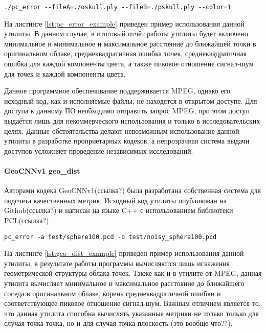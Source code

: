 \begin{lstlisting}[caption={
    Пример использования утилиты mpeg-pcc-dmetric, параметр fileA -
    оригинальное облако, fileB - реконструированное облако, color=1 - также
    вычисляются значения искажения цветов.
}, label={lst:pc_error_example}]
./pc_error --fileA=./oskull.ply --fileB=./pskull.ply --color=1
\end{lstlisting}

На листинге \ref{lst:pc_error_example} приведен пример использования данной
утилиты. В данном случае, в итоговый отчёт работы утилиты будет включено
минимальное и минимальное и максимальное расстояние до ближайшей точки в
оригинальном облаке, среднеквадратичная ошибка точек, среднеквадратичная ошибка
для каждой компоненты цвета, а также пиковое отношение сигнал-шум для точек и
каждой компоненты цвета.

Данное программное обеспечивание поддерживается MPEG, однако его исходный код,
как и исполняемые файлы, не находятся в открытом доступе. Для доступа к данному
ПО необходимо отправить запрос MPEG, при этом доступ выдаётся лишь для
некоммерческого использования и только в исследовательских целях. Данные
обстоятельства делают невозможным использование данной утилиты в разработке
проприетарных кодеков, а непрозрачная система выдачи доступов усложняет
проведение независимых исследований.

\paragraph{GeoCNNv1 geo\_dist}

Авторами кодека GeoCNNv1(ссылка?) была разработана собственная система для
подсчета качественных метрик. Исходный код утилиты опубликован на
Github(ссылка?) и написан на языке C++ с использованием библиотеки PCL(ссылка?).

\begin{lstlisting}[caption={
    Пример использования утилиты geo\_dist, параметр a - оригинальное облако, b
    - реконструированное облако.
}, label={lst:geo_dist_example}]
pc_error -a test/sphere100.pcd -b test/noisy_sphere100.pcd
\end{lstlisting}

На листинге \ref{lst:geo_dist_example} приведен пример использования данной
утилиты, в результате работы программы вычисляются лишь искажения геометрической
структуры облака точек. Также как и в утилите от MPEG, данная утилита вычисляет
минимальное и максимальное расстояние до ближайшего соседа в оригинальном
облаке, корень среднеквадратичной ошибки и соответствующее пиковое отношение
сигнал-шум. Важным отличием является то, что данная утилита способна вычислять
указанные метрики не только только для случая точка-точка, но и для случая
точка-плоскость (это вообще что??).

